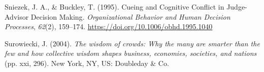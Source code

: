 \documentclass[
  man,floatsintext]{apa6}
\newlength{\cslhangindent}
\newlength{\cslentryspacingunit} %
\newenvironment{CSLReferences}[2] %
 {%
  \setlength{\parindent}{0pt}
  \ifodd #1
  \let\oldpar\par
  \def\par{\hangindent=\cslhangindent\oldpar}
  \fi
  \setlength{\parskip}{#2\cslentryspacingunit}
 }%
 {}
\begin{document}
\begin{CSLReferences}{1}{0}
\leavevmode{}%
Sniezek, J. A., \& Buckley, T. (1995). Cueing and {Cognitive Conflict} in {Judge-Advisor Decision Making}. \emph{Organizational Behavior and Human Decision Processes}, \emph{62}(2), 159--174. \url{https://doi.org/10.1006/obhd.1995.1040}

\leavevmode{}%
Surowiecki, J. (2004). \emph{The wisdom of crowds: {Why} the many are smarter than the few and how collective wisdom shapes business, economies, societies, and nations} (pp. xxi, 296). New York, NY, US: Doubleday \& Co.

\end{CSLReferences}




\end{document}
